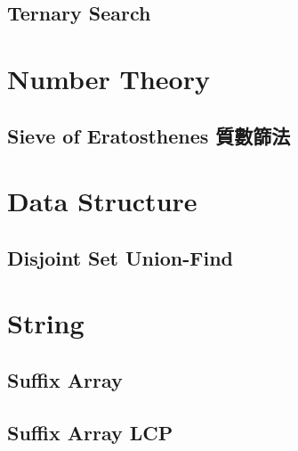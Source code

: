     \subsection{Ternary Search}
        
\section{Number Theory}
    \subsection{Sieve of Eratosthenes 質數篩法}
        

\section{Data Structure}
    \subsection{Disjoint Set Union-Find}
        

\section{String}
    \subsection{Suffix Array}
        
    \subsection{Suffix Array LCP}
        

    
